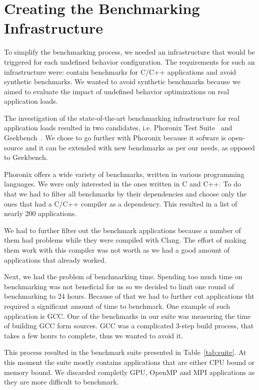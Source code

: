 \section{Creating the Benchmarking Infrastructure} \label{sec:benchmarks}

To simplify the benchmarking process, we needed an infrastructure that would be
triggered for each undefined behavior configuration. The requirements for such
an infrastructure were: contain benchmarks for C/C++ applications and avoid
synthetic benchmarks. We wanted to avoid synthetic benchmarks because we aimed
to evaluate the impact of undefined behavior optimizations on real application
loads.

The investigation of the state-of-the-art benchmarking infrastructure for real
application loads resulted in two candidates, i.e. Phoronix Test
Suite~\cite{phoronix} and Geekbench~\cite{geekbench}. We chose to go further
with Phoronix because it sofware is open-source and it can be extended with new
benchmarks as per our needs, as opposed to Geekbench.

Phoronix offers a wide variety of benchmarks, written in various programming
languages. We were only interested in the ones written in C and C++. To do that
we had to filter all benchmarks by their dependencies and choose only the ones
that had a C/C++ compiler as a dependency. This resulted in a list of nearly 200
applications.

We had to further filter out the benchmark applications because a number of them
had problems while they were compiled with Clang. The effort of making them work
with this compiler was not worth as we had a good amount of applications that
already worked.

Next, we had the problem of benchmarking time. Spending too much time on
benchmarking was not beneficial for us so we decided to limit one round of
benchmarking to 24 hours. Because of that we had to further cut applications tht
required a significant amount of time to benchmark. One example of such
application is GCC. One of the benchmarks in our suite was measuring the time of
building GCC form sources. GCC was a complicated 3-step build process, that
takes a few hours to complete, thus we wanted to avoid it.

This process resulted in the benchmark suite presented in Table~\ref{tab:suite}.
At this moment the suite mostly  contains applications that are either CPU bound
or memory bound. We discarded completly GPU, OpenMP and MPI applications as they
are more difficult to benchmark.
